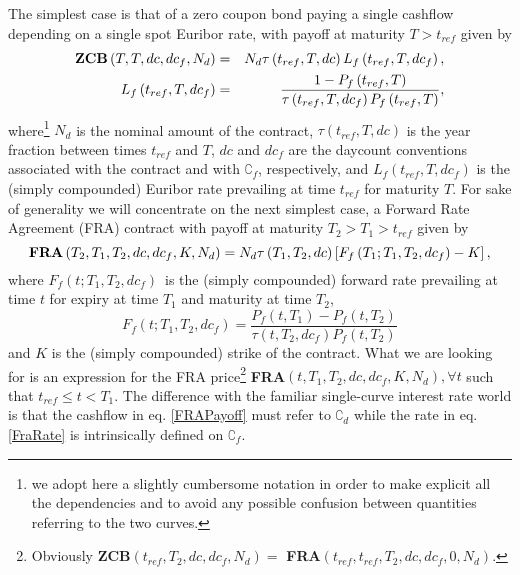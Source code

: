 \documentclass[11pt,reqno]{amsart}
\begin{document}
The simplest case is that of a zero coupon bond paying a single cashflow
depending on a single spot Euribor rate, with payoff at maturity $T>t_{ref}$
given by%
\begin{eqnarray}
\text{\textbf{ZCB}}\left( T,T,dc,dc_{f},N_{d}\right)  &=&N_{d}\tau \left(
t_{ref},T,dc\right) L_{f}\left( t_{ref},T,dc_{f}\right) ,  \label{ZCBPayoff}
\\
L_{f}\left( t_{ref},T,dc_{f}\right)  &=&\frac{1-P_{f}\left( t_{ref},T\right) 
}{\tau \left( t_{ref},T,dc_{f}\right) P_{f}\left( t_{ref},T\right) },
\end{eqnarray}%
where\footnote{%
we adopt here a slightly cumbersome notation in order to make explicit all
the dependencies and to avoid any possible confusion between quantities
referring to the two curves.} $N_{d}$ is the nominal amount of the contract, 
$\tau \left( t_{ref},T,dc\right) $ is the year fraction between times $%
t_{ref}$ and $T$, $dc$ and $dc_{f}$ are the daycount conventions associated
with the contract and with $\complement _{f}$, respectively, and $%
L_{f}\left( t_{ref},T,dc_{f}\right) $ is the (simply compounded) Euribor rate
prevailing at time $t_{ref}$ for maturity $T$. For sake of generality we
will concentrate on the next simplest case, a Forward Rate Agreement (FRA)
contract with payoff at maturity $T_{2}>T_{1}>t_{ref}$ given by%
\begin{equation}
\text{\textbf{FRA}}\left( T_{2},T_{1},T_{2},dc,dc_{f},K,N_{d}\right)
=N_{d}\tau \left( T_{1},T_{2},dc\right) \left[ F_{f}\left(
T_{1};T_{1},T_{2},dc_{f}\right) -K\right] ,  \label{FRAPayoff}
\end{equation}%
where $F_{f}\left( t;T_{1},T_{2},dc_{f}\right) $\ is the (simply compounded)
forward rate prevailing at time $t$ for expiry at time $T_{1}$ and maturity
at time $T_{2}$, 
\begin{equation}
F_{f}\left( t;T_{1},T_{2},dc_{f}\right) =\frac{P_{f}\left( t,T_{1}\right)
-P_{f}\left( t,T_{2}\right) }{\tau \left( t,T_{2},dc_{f}\right) P_{f}\left(
t,T_{2}\right) }  \label{FraRate}
\end{equation}%
and $K$ is the (simply compounded) strike of the contract. What we are
looking for is an expression for the FRA price\footnote{%
Obviously \textbf{ZCB}$\left( t_{ref},T_{2},dc,dc_{f},N_{d}\right) =$\textbf{%
FRA}$\left( t_{ref},t_{ref},T_{2},dc,dc_{f},0,N_{d}\right) .$} \textbf{FRA}$%
\left( t,T_{1},T_{2},dc,dc_{f},K,N_{d}\right) ,\forall t$ such that $%
t_{ref}\leq t<T_{1}$. The difference with the familiar single-curve interest
rate world is that the cashflow in eq. \ref{FRAPayoff} must refer to $%
\complement _{d}$ while the rate in eq. \ref{FraRate} is intrinsically
defined on $\complement _{f}$.
\end{document}

